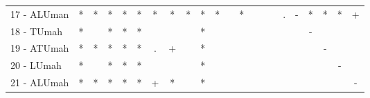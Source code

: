 \begin{table}[h]
\begin{center}
\begin{tabular}{lcc|cc|cc|cc|cc|cc|cc|cc|cc|cc|c}
17 - ALUman	& * & * & * & * & * & * & * & * & * & * &   & * &   &   &   & . & - & * & * & * & + \\
18 - TUmah	& * &   & * & * & * &   &   &   & * &   &   &   &   &   &   &   &   & - &   &   &   \\ \hline
19 - ATUmah	& * & * & * & * & * & . & + &   & * &   &   &   &   &   &   &   &   &   & - &   &   \\
20 - LUmah	& * &   & * & * & * &   &   &   & * &   &   &   &   &   &   &   &   &   &   & - &   \\ \hline
21 - ALUmah	& * & * & * & * & * & + & * &   & * &   &   &   &   &   &   &   &   &   &   &   & - \\\end{tabular}
\label{stratsALCKappaFriedC4.5}
\end{center}
\end{table}